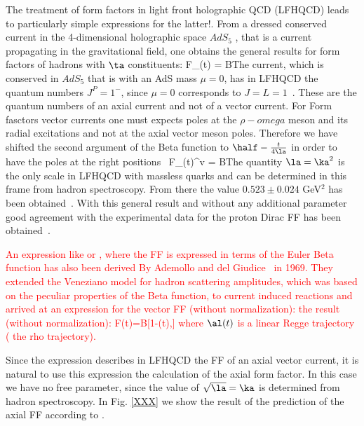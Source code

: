 


The treatment of form factors in light front holographic QCD
(LFHQCD) leads to particularly simple expressions for the
latter!\cite{}. From a dressed conserved current in the
4-dimensional holographic space $AdS_5$ , that is a current
propagating in the gravitational field, one obtains the general
results for form factors of hadrons with   $\ta$ constituents:
\beq {} F_\ta(t) =  B \enq The current, which is conserved in
$AdS_5$ that is with an AdS  mass $\mu=0$, has in LFHQCD the
quantum numbers $J^P= 1^-$, since $\mu =0$ corresponds to
$J=L=1$~\cite{}. These are the quantum numbers of  an  axial
current and not of a vector current. For Form fasctors  vector
currents  one must expects  poles at the $\rho-omega$ meson and
its radial excitations and not at the axial vector meson poles.
Therefore we have shifted the second argument of the Beta function
to $\half - \frac{t}{4 \la}$ in order to have the poles at the
right positions~\cite{} \beq {} F_\ta(t)^v =
 B \enq The quantity  $\la = \ka^2$ is the only scale in
LFHQCD with massless quarks and can be determined in this frame
from hadron spectroscopy.  From there the value $0.523 \pm 0.024 $
GeV$^2$ has been obtained~\cite{}. With this general result and
without any additional parameter good agreement with the
experimental data for the proton Dirac FF has been
obtained~\cite{}.

\textcolor{red}{ An expression like  or ,
where the FF is expressed in terms of the Euler Beta function has
also been derived By Ademollo and del
Giudice~\cite{Ademollo:1969wd} in 1969. They extended the
Veneziano model for hadron scattering amplitudes, which was based
on the peculiar properties of the Beta function, to current
induced reactions and arrived at an expression for the vector FF
(without normalization):
 the result (without normalization):
\beq {} F(t)=B[1-\al(t),] \enq
 where $ \al(t)$ is a linear Regge trajectory ( the rho trajectory). }

Since the expression   describes  in LFHQCD the FF of
an axial vector current, it is natural to  use this expression the
calculation of the axial form factor. In this case we have no free
parameter, since the value of $\sqrt{\la} = \ka$ is determined
from hadron spectroscopy. In Fig. \ref{XXX} we show the result of
the prediction of the axial FF according to .

